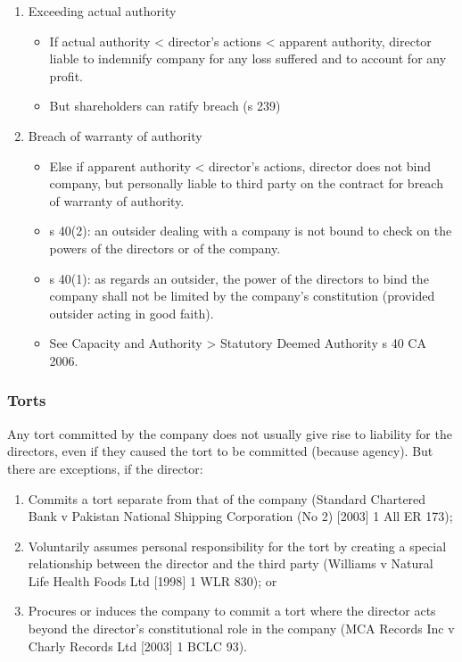 \documentclass[
]{article}
\providecommand{\tightlist}{%
  \setlength{\itemsep}{0pt}\setlength{\parskip}{0pt}}
\begin{document}
\begin{enumerate}
\tightlist
\item
  Exceeding actual authority

  \begin{itemize}
  \tightlist
  \item
    If actual authority \textless{} director's actions \textless{}
    apparent authority, director liable to indemnify company for any
    loss suffered and to account for any profit.
  \item
    But shareholders can ratify breach (s 239)
  \end{itemize}
\item
  Breach of warranty of authority

  \begin{itemize}
  \tightlist
  \item
    Else if apparent authority \textless{} director's actions, director
    does not bind company, but personally liable to third party on the
    contract for breach of warranty of authority.
  \item
    s 40(2): an outsider dealing with a company is not bound to check on
    the powers of the directors or of the company.
  \item
    s 40(1): as regards an outsider, the power of the directors to bind
    the company shall not be limited by the company's constitution
    (provided outsider acting in good faith).
  \item
    See Capacity and Authority \textgreater{} Statutory Deemed Authority
    s 40 CA 2006.
  \end{itemize}
\end{enumerate}

\hypertarget{torts}{%
\subsubsection{Torts}\label{torts}}

Any tort committed by the company does not usually give rise to
liability for the directors, even if they caused the tort to be
committed (because agency). But there are exceptions, if the director:

\begin{enumerate}
\tightlist
\item
  Commits a tort separate from that of the company (Standard Chartered
  Bank v Pakistan National Shipping Corporation (No 2) {[}2003{]} 1 All
  ER 173);
\item
  Voluntarily assumes personal responsibility for the tort by creating a
  special relationship between the director and the third party
  (Williams v Natural Life Health Foods Ltd {[}1998{]} 1 WLR 830); or
\item
  Procures or induces the company to commit a tort where the director
  acts beyond the director's constitutional role in the company (MCA
  Records Inc v Charly Records Ltd {[}2003{]} 1 BCLC 93).
\end{enumerate}
\end{document}
